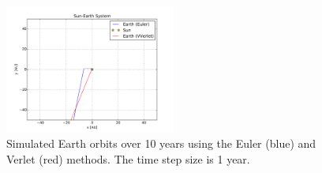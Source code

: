 \documentclass[10pt,showpacs,preprintnumbers,footinbib,amsmath,amssymb,aps,prl,twocolumn,groupedaddress,superscriptaddress,showkeys]{revtex4-1}
\begin{document}
\begin{figure}
\centering
	\includegraphics[width=0.5\textwidth]{figures/se10.pdf}
	\caption{Simulated Earth orbits over 10 years using the Euler (blue) and
	Verlet (red) methods. The time step size is 1 year.}
	\label{fig:se10}
\end{figure}

\clearpage



\end{document}
